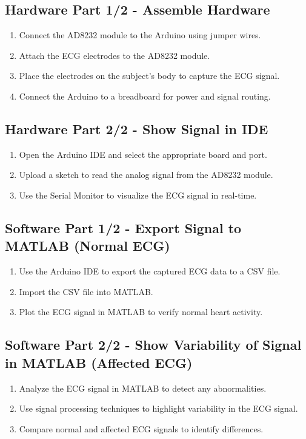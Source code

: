 \documentclass[12pt]{article}
\begin{document}
\subsection{Hardware Part 1/2 - Assemble Hardware}
\begin{enumerate}
    \item Connect the AD8232 module to the Arduino using jumper wires.
    \item Attach the ECG electrodes to the AD8232 module.
    \item Place the electrodes on the subject's body to capture the ECG signal.
    \item Connect the Arduino to a breadboard for power and signal routing.
\end{enumerate}

\subsection{Hardware Part 2/2 - Show Signal in IDE}
\begin{enumerate}
    \item Open the Arduino IDE and select the appropriate board and port.
    \item Upload a sketch to read the analog signal from the AD8232 module.
    \item Use the Serial Monitor to visualize the ECG signal in real-time.
\end{enumerate}

\subsection{Software Part 1/2 - Export Signal to MATLAB (Normal ECG)}
\begin{enumerate}
    \item Use the Arduino IDE to export the captured ECG data to a CSV file.
    \item Import the CSV file into MATLAB.
    \item Plot the ECG signal in MATLAB to verify normal heart activity.
\end{enumerate}

\subsection{Software Part 2/2 - Show Variability of Signal in MATLAB (Affected ECG)}
\begin{enumerate}
    \item Analyze the ECG signal in MATLAB to detect any abnormalities.
    \item Use signal processing techniques to highlight variability in the ECG signal.
    \item Compare normal and affected ECG signals to identify differences.
\end{enumerate}
\end{document}
